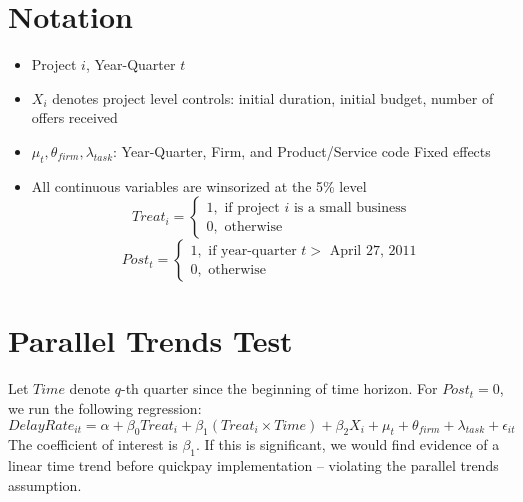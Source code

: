 \documentclass[
]{article}
\providecommand{\tightlist}{%
  \setlength{\itemsep}{0pt}\setlength{\parskip}{0pt}}
\begin{document}
\hypertarget{notation}{%
\section{Notation}\label{notation}}

\begin{itemize}
\tightlist
\item
  Project \(i\), Year-Quarter \(t\)
\item
  \(X_i\) denotes project level controls: initial duration, initial
  budget, number of offers received
\item
  \(\mu_t,\theta_{firm},\lambda_{task}\): Year-Quarter, Firm, and
  Product/Service code Fixed effects
\item
  All continuous variables are winsorized at the 5\% level
  \[ Treat_i = \begin{cases} 1, \text{ if project } i \text{ is a small business}\\
  0, \text{ otherwise} \end{cases}\]
  \[ Post_t = \begin{cases} 1, \text{ if year-quarter } t > \text{ April 27, 2011}\\
  0, \text{ otherwise} \end{cases}\]
\end{itemize}

\hypertarget{parallel-trends-test}{%
\section{Parallel Trends Test}\label{parallel-trends-test}}

Let \(Time\) denote \(q\)-th quarter since the beginning of time
horizon. For \(Post_t =0\), we run the following regression:
\[ DelayRate_{it} = \alpha+\beta_0 Treat_i + \beta_1 (Treat_i \times Time) + \beta_2 X_i + \mu_t + \theta_{firm} + \lambda_{task} +\epsilon_{it}\]
The coefficient of interest is \(\beta_1\). If this is significant, we
would find evidence of a linear time trend before quickpay
implementation -- violating the parallel trends assumption.
\end{document}
